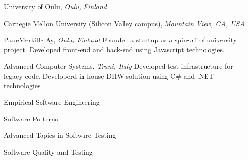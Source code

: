 \documentclass[9pt]{article}
\begin{document}
\noindent University of Oulu, \emph{Oulu, Finland} \vspace{0.01in} 
\newline{}
\bigskip

\noindent Carnegie Mellon University (Silicon Valley campus), \emph{Mountain View, CA, USA} \vspace{0.01in}  
\newline{}
\bigskip

\noindent PaneMerkille Ay, \emph{Oulu, Finland} \vspace{0.01in} 
\newline{}
\newline\noindent Founded a startup as a spin-off of university project.
\newline\noindent Developed front-end and back-end using Javascript technologies.
\bigskip

\noindent Advanced Computer Systems, \emph{Trani, Italy} \vspace{0.01in} 
\newline{}
\newline\noindent Developed test infrastructure for legacy code.
\newline\noindent Developerd in-house DHW solution using C\# and .NET technologies.
\bigskip

\medskip
{}

  
\newline\noindent Empirical Software Engineering 
\bigskip

  
\newline\noindent Software Patterns 
\bigskip

 
\newline\noindent Advanced Topics in Software Testing 
\bigskip

 
\newline\noindent Software Quality and Testing 
\bigskip
\end{document}
